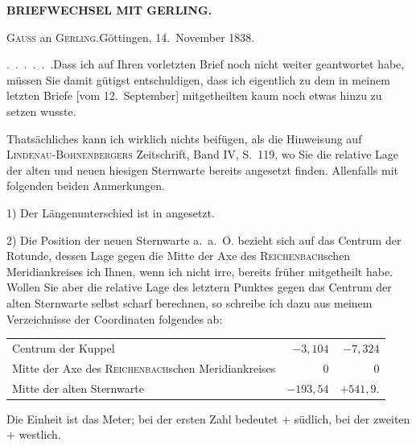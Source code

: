 \par\clearpage
\noindent{}\hfill{\small\textbf{BRIEFWECHSEL MIT GERLING.}}\hfill\null\par\medskip
\begin{center}
\textsc{Gauss} an \textsc{Gerling}.\quad Göttingen, 14.~November 1838.
\end{center}
\par\noindent\hspace*{\parindent}\mbox{.\ .\ .\ .\ .\ .}\quad Dass ich auf Ihren vorletzten Brief noch nicht weiter geantwortet habe, müssen Sie damit gütigst entschuldigen, dass ich eigentlich zu dem in meinem letzten Briefe [vom 12.~September] mitgetheilten kaum noch etwas hinzu zu setzen wusste.
\par\noindent\hspace*{\parindent}Thatsächliches kann ich wirklich nichts beifügen, als die Hinweisung auf \textsc{Lindenau-Bohnenbergers} Zeitschrift, Band IV, S.~119, wo Sie die relative Lage der alten und neuen hiesigen Sternwarte bereits angesetzt finden. Allenfalls mit folgenden beiden Anmerkungen.
\par\noindent\hspace*{\parindent}1) Der Längenunterschied ist in  angesetzt.
\par\noindent\hspace*{\parindent}2) Die Position der neuen Sternwarte a.~a.~O. bezieht sich auf das Centrum der Rotunde, dessen Lage gegen die Mitte der Axe des \textsc{Reichenbach}schen Meridiankreises ich Ihnen, wenn ich nicht irre, bereits früher mitgetheilt habe. Wollen Sie aber die relative Lage des letztern Punktes gegen das Centrum der alten Sternwarte selbst scharf berechnen, so schreibe ich dazu aus meinem Verzeichnisse der Coordinaten folgendes ab:
\begin{center}
\setlength{\tabcolsep}{4pt}
\begin{tabular}{@{}lrr@{}}
Centrum der Kuppel & \(-3{,}104\) & \(-7{,}324\)\\
Mitte der Axe des \textsc{Reichenbach}schen Meridiankreises & \(0\) & \(0\)\\
Mitte der alten Sternwarte & \(-193{,}54\) & \(+541{,}9\).
\end{tabular}
\end{center}
\par\noindent\hspace*{\parindent}Die Einheit ist das Meter; bei der ersten Zahl bedeutet \(+\) südlich, bei der zweiten \(+\) westlich.
